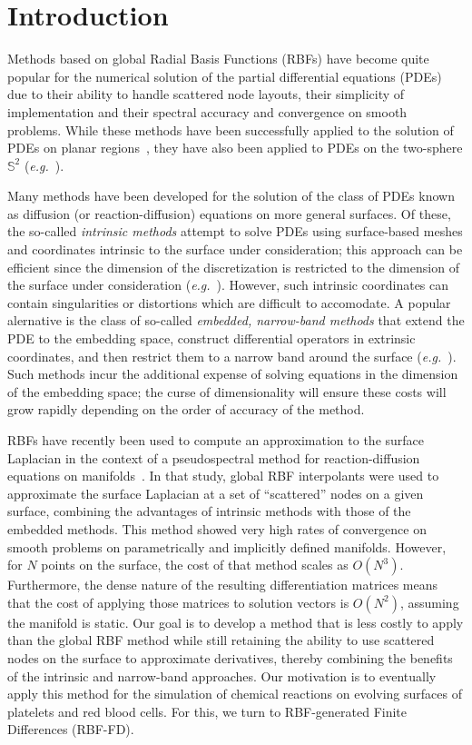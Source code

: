 \documentclass[smallextended]{svjour3}
\begin{document}
\section{Introduction}
\label{sec:intro}

Methods based on global Radial Basis Functions (RBFs) have become quite popular for the numerical solution of the partial differential equations (PDEs) due to their ability to handle scattered node layouts, their simplicity of implementation and their spectral accuracy and convergence on smooth problems. While these methods have been successfully applied to the solution of PDEs on planar regions~\cite{Fasshauer:2007}, they have also been applied to PDEs on the two-sphere $\mathbb{S}^2$ (\emph{e.g.}~\cite{Gia:2005, FlyerWright:2007, FlyerWright:2009}).

Many methods have been developed for the solution of the class of PDEs known as diffusion (or reaction-diffusion) equations on more general surfaces. Of these, the so-called \emph{intrinsic methods} attempt to solve PDEs using surface-based meshes and coordinates intrinsic to the surface under consideration; this approach can be efficient since the dimension of the discretization is restricted to the dimension of the surface under consideration (\emph{e.g.}~\cite{Calhoun2009,Dziuk2007}). However, such intrinsic coordinates can contain singularities or distortions which are difficult to accomodate. A popular alernative is the class of so-called \emph{embedded, narrow-band methods} that extend the PDE to the embedding space, construct differential operators in extrinsic coordinates, and then restrict them to a narrow band around the surface (\emph{e.g.}~\cite{MacDonaldRuuth2009,Piret2012}). Such methods incur the additional expense of solving equations in the dimension of the embedding space; the curse of dimensionality will ensure these costs will grow rapidly depending on the order of accuracy of the method. 

RBFs have recently been used to compute an approximation to the surface Laplacian in the context of a pseudospectral method for reaction-diffusion equations on manifolds~\cite{FuselierWright2012}. In that study, global RBF interpolants were used to approximate the surface Laplacian at a set of ``scattered'' nodes on a given surface, combining the advantages of intrinsic methods with those of the embedded methods. This method showed very high rates of convergence on smooth problems on parametrically and implicitly defined manifolds. However, for $N$ points on the surface, the cost of that method scales as $O(N^3)$. Furthermore, the dense nature of the resulting differentiation matrices means that the cost of applying those matrices to solution vectors is $O(N^2)$, assuming the manifold is static. Our goal is to develop a method that is less costly to apply than the global RBF method while still retaining the ability to use scattered nodes on the surface to approximate derivatives, thereby combining the benefits of the intrinsic and narrow-band approaches. Our motivation is to eventually apply this method for the simulation of chemical reactions on evolving surfaces of platelets and red blood cells. For this, we turn to RBF-generated Finite Differences (RBF-FD).
\end{document}
